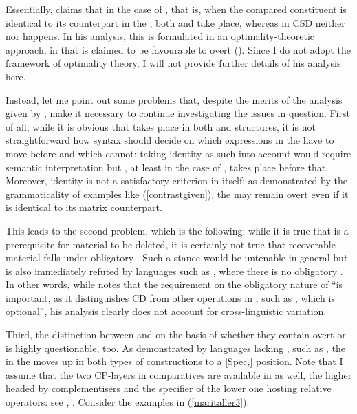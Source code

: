 Essentially, \citet[582--583]{kennedy2002} claims that in the case of , that is, when the compared constituent is identical to its counterpart in the , both  and  take place, whereas in CSD neither  nor  happens. In his analysis, this is formulated in an optimality-theoretic approach, in that  is claimed to be favourable to overt  (\citealt[583]{kennedy2002}). Since I do not adopt the framework of optimality theory, I will not provide further details of his analysis here.

Instead, let me point out some problems that, despite the merits of the analysis given by \citet{kennedy2002}, make it necessary to continue investigating the issues in question. First of all, while it is obvious that  takes place in both  and  structures, it is not straightforward how syntax should decide on which  expressions in the  have to move before  and which cannot: taking identity as such into account would require semantic interpretation but , at least in the case of , takes place before that. Moreover, identity is not a satisfactory criterion in itself: as demonstrated by the grammaticality of examples like (\ref{contrastgiven}), the  may remain overt even if it is identical to its matrix  counterpart.

This leads to the second problem, which is the following: while it is true that  is a prerequisite for material to be deleted, it is certainly not true that recoverable material falls under obligatory . Such a stance would be untenable in general but is also immediately refuted by languages such as , where there is no obligatory . In other words, while \citet[554]{kennedy2002} notes that the requirement on the obligatory nature of  ``is important, as it distinguishes CD from other  operations in , such as , which is optional'', his analysis clearly does not account for cross-linguistic variation.

Third, the distinction between  and  on the basis of whether they contain overt or  is highly questionable, too. As demonstrated by languages lacking , such as , the  in the  moves up in both types of constructions to a [Spec,] position. Note that I assume that the two CP-layers in comparatives are available in  as well, the higher headed by complementisers and the specifier of the lower one hosting relative operators: see \citet{kantor2008even}, \citet{bacskaiatkari2010even}. Consider the examples in (\ref{maritaller3}):


